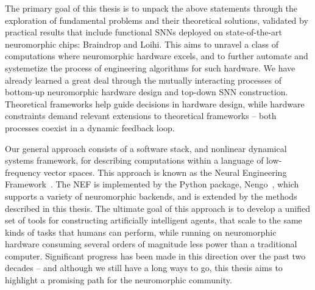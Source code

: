 The primary goal of this thesis is to unpack the above statements through the exploration of fundamental problems and their theoretical solutions, validated by practical results that include functional SNNs deployed on state-of-the-art neuromorphic chips: Braindrop and Loihi.
This aims to unravel a class of computations where neuromorphic hardware excels, and to further automate and systemetize the process of engineering algorithms for such hardware.
We have already learned a great deal through the mutually interacting processes of bottom-up neuromorphic hardware design and top-down SNN construction.
Theoretical frameworks help guide decisions in hardware design, while hardware constraints demand relevant extensions to theoretical frameworks -- both processes coexist in a dynamic feedback loop.

Our general approach consists of a software stack, and nonlinear dynamical systems framework,
for describing computations within a language of low-frequency vector spaces.
This approach is known as the Neural Engineering Framework~\citep[NEF;][]{eliasmith2003a}.
The NEF is implemented by the Python package, Nengo~\citep{bekolay2014}, which supports a variety of neuromorphic backends, and is extended by the methods
described in this thesis.
The ultimate goal of this approach is to develop a unified set of tools for constructing
artificially intelligent agents, that scale to the same kinds of tasks that
humans can perform, while running on neuromorphic hardware consuming several orders of magnitude less power than a traditional computer.
Significant progress has been made in this direction over the past two decades -- and although we still
have a long ways to go, this thesis aims to highlight a promising path for the neuromorphic community.

